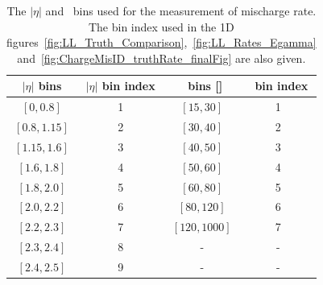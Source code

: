 \begin{table}[htp]
\centering

\begin{tabular}{c|c||c|c}
	 \hline
	  $|\eta|$ bins & $|\eta|$ bin index   & \pt\ bins [\GeV] & \pt\ bin index \\
 	 \hline
	  $[0, 0.8]   $   & 1 	   &  $[15, 30]$ & 1 \\
	  $[0.8, 1.15]$   & 2 	   &  $[30, 40]$ & 2 \\
	  $[1.15, 1.6]$   & 3 	   &  $[40, 50]$ & 3 \\
	  $[1.6, 1.8] $   & 4 	   &  $[50, 60]$ & 4 \\
	  $[1.8, 2.0] $   & 5 	   &  $[60, 80]$ & 5 \\
	  $[2.0, 2.2] $   & 6 	   &  $[80, 120]$ & 6 \\
	  $[2.2, 2.3] $   & 7 	   &  $[120, 1000]$ & 7 \\
	  $[2.3, 2.4] $   & 8 	   &  - & - \\
	  $[2.4, 2.5] $   & 9 	   &   - & - \\


  \hline
\end{tabular}
\caption{The $|\eta|$ and \pt\ bins used for the measurement of mischarge
  rate. The bin index used in the 1D figures~\ref{fig:LL_Truth_Comparison},~\ref{fig:LL_Rates_Egamma} and~\ref{fig:ChargeMisID_truthRate_finalFig} are also given.}
\label{tab:Etbin and Etabin of mis-charge rate}
\end{table}


